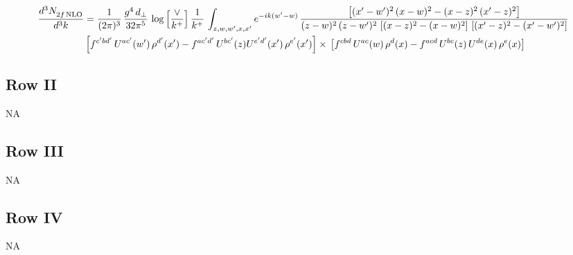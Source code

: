 \documentclass[9pt]{article}
\newcommand{\old}[1]{{\color{red}#1}}
\numberwithin{equation}{section}
\begin{document}
{\color{red}\begin{align}
    \frac{d^{3}N_{2f\,\rm NLO}^{\rm}}{d^{3}k}  & = \frac{1}{(2\pi)^{3}}\, \frac{g^{4}\,d_{\perp}}{32\pi^{5}}\,\log{\left[\frac{\vee}{ k^{+}}\right]}\,\frac{1}{k^{+}}\,\int_{z,w,w^{\prime},x,x'} e^{-ik(w^{\prime}-w)}\,\frac{\left[(x'-w')^{2}\, (x-w)^{2} - (x-z)^{2}\, (x'-z)^{2}\right]}{(z-w)^{2}\, (z-w')^{2}\,\left[(x-z)^{2} - (x-w)^{2}\right]\, \left[(x'-z)^{2} - (x'-w')^{2}\right]}\notag \\ &   \left[f^{c'bd'}\, U^{ac'}(w')\,\rho^{d'}(x')-f^{ac'd'}\, U^{bc'}(z)U^{e'd'}(x')\, \rho^{e'}(x')\right]\times\, \left[f^{cbd}\, U^{ac}(w)\,\rho^{d}(x) - f^{acd}\, U^{bc}(z)\,U^{de}(x)\, \rho^{e}(x)\right]
\end{align}}
\subsection{Row II}
\textsc{NA}
\subsection{Row III}
\textsc{NA}
\subsection{Row IV}
\old{\textsc{NA}}
\end{document}
